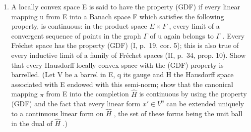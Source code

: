 \begin{enumerate}
\def\labelenumi{\arabic{enumi})}
\setcounter{enumi}{25}
\tightlist
\item
  A locally convex space E is said to have the property (GDF) if every linear mapping u from E into a Banach space F which satisfies the following property, is continuous: in the product space \(E \times F\) , every limit of a convergent sequence of points in the graph \(\Gamma\) of u again belongs to \(\Gamma\) . Every Fréchet space has the property (GDF) (I, p.~19, cor. 5); this is also true of every inductive limit of a family of Fréchet spaces (II, p.~34, prop. 10). Show that every Hausdorff locally convex space with the (GDF) property is barrelled. (Let V be a barrel in E, q its gauge and H the Hausdorff space associated with E endowed with this semi-norm; show that the canonical mapping \(\pi\) from E into the completion \(\hat{H}\) is continuous by using the property (GDF) and the fact that every linear form \(x' \in V^{0}\) can be extended uniquely to a continuous linear form on \(\hat{H}\) , the set of these forms being the unit ball in the dual of \(\hat{H}\) .)
\end{enumerate}

